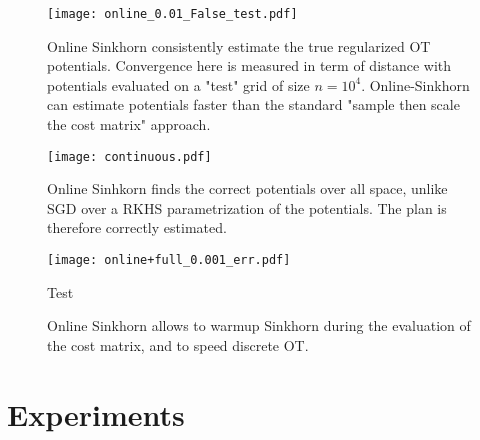 \begin{figure}[t]
    \centering
    \texttt{[image: online\_0.01\_False\_test.pdf]}
    \caption{Online Sinkhorn consistently estimate the true regularized OT potentials. Convergence here is measured in term of distance with potentials evaluated on a "test" grid of size $n=10^4$. Online-Sinkhorn can estimate potentials faster than the standard "sample then scale the cost matrix" approach.}
    \label{fig:potentials}
\end{figure}

\begin{figure}[t]
    \centering
    \texttt{[image: continuous.pdf]}
    \caption{Online Sinhkorn finds the correct potentials over all space, unlike SGD over a RKHS parametrization of the potentials. The plan is therefore correctly estimated.}
    \label{fig:potentials}
\end{figure}

\begin{figure}[t]
    \begin{minipage}{.7\textwidth}
    \texttt{[image: online+full\_0.001\_err.pdf]}
    \caption{Online Sinkhorn allows to warmup Sinkhorn during the evaluation of the cost matrix, and to speed discrete OT.}
    \label{fig:potentials}
    \end{minipage}%
    \begin{minipage}{.29\textwidth}Test
    \end{minipage}
\end{figure}

\section{Experiments}\label{sec:exps}



